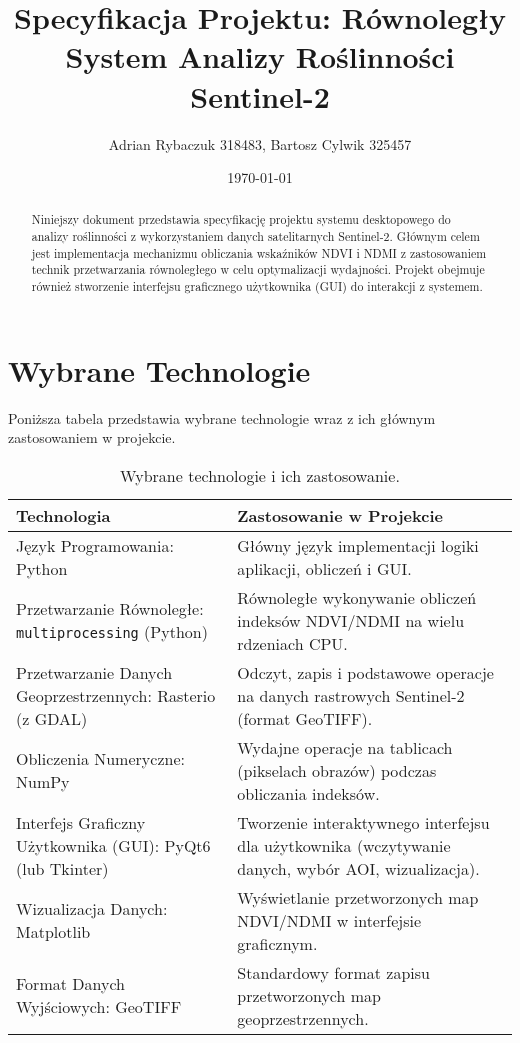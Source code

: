 \documentclass[12pt,a4paper]{article}
\title{Specyfikacja Projektu: Równoległy System Analizy Roślinności Sentinel-2}
\author{Adrian Rybaczuk 318483, Bartosz Cylwik 325457}
\date{\today}
\begin{document}
\maketitle

\begin{abstract}
\noindent Niniejszy dokument przedstawia specyfikację projektu systemu desktopowego do analizy roślinności z wykorzystaniem danych satelitarnych Sentinel-2. Głównym celem jest implementacja mechanizmu obliczania wskaźników NDVI i NDMI z zastosowaniem technik przetwarzania równoległego w celu optymalizacji wydajności. Projekt obejmuje również stworzenie interfejsu graficznego użytkownika (GUI) do interakcji z systemem.
\end{abstract}


\section*{Wybrane Technologie}
\label{sec:technologies}
Poniższa tabela przedstawia wybrane technologie wraz z ich głównym zastosowaniem w projekcie.

\begin{table}[H]
    \centering
    \caption{Wybrane technologie i ich zastosowanie.}
    \label{tab:technologies}
    \begin{tabular}{>{\raggedright\arraybackslash}p{} >{\raggedright\arraybackslash}p{}}
        \toprule
        \textbf{Technologia} & \textbf{Zastosowanie w Projekcie} \\
        \midrule
        Język Programowania: Python & Główny język implementacji logiki aplikacji, obliczeń i GUI. \\
        \addlinespace
        Przetwarzanie Równoległe: \texttt{multiprocessing} (Python) & Równoległe wykonywanie obliczeń indeksów NDVI/NDMI na wielu rdzeniach CPU. \\
        \addlinespace
        Przetwarzanie Danych Geoprzestrzennych: Rasterio (z GDAL) & Odczyt, zapis i podstawowe operacje na danych rastrowych Sentinel-2 (format GeoTIFF). \\
        \addlinespace
        Obliczenia Numeryczne: NumPy & Wydajne operacje na tablicach (pikselach obrazów) podczas obliczania indeksów. \\
        \addlinespace
        Interfejs Graficzny Użytkownika (GUI): PyQt6 (lub Tkinter) & Tworzenie interaktywnego interfejsu dla użytkownika (wczytywanie danych, wybór AOI, wizualizacja). \\
        \addlinespace
        Wizualizacja Danych: Matplotlib & Wyświetlanie przetworzonych map NDVI/NDMI w interfejsie graficznym. \\
        \addlinespace
        Format Danych Wyjściowych: GeoTIFF & Standardowy format zapisu przetworzonych map geoprzestrzennych. \\
        \bottomrule
    \end{tabular}
\end{table}
\end{document}
